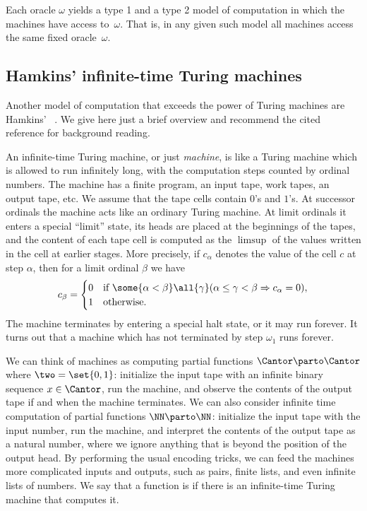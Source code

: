 Each oracle $\omega$ yields a type 1 and a type 2 model of computation in which the machines have access to~$\omega$. That is, in any given such model all machines access the same fixed oracle~$\omega$.


\subsection{Hamkins' infinite-time Turing machines}

\label{sec:iitm}

Another model of computation that exceeds the power of Turing machines are Hamkins' ~. We give here just a brief overview and recommend the cited reference for background reading.

An infinite-time Turing machine, or just \emph{machine}, is like a Turing
machine which is allowed to run infinitely long, with the computation steps
counted by ordinal numbers. The machine has a finite program, an input tape, work
tapes, an output tape, etc. We assume that the tape cells contain $0$'s and
$1$'s. At successor ordinals the machine acts like an ordinary Turing machine.
At limit ordinals it enters a special ``limit'' state, its heads are placed at
the beginnings of the tapes, and the content of each tape cell is computed as
the $\limsup$ of the values written in the cell at earlier stages. More
precisely, if $c_\alpha$ denotes the value of the cell $c$ at step $\alpha$,
then for a limit ordinal $\beta$ we have
%
\begin{equation*}
  c_\beta =
  \begin{cases}
    0 & \text{if $\some{\alpha < \beta} \all{\gamma}
      (\alpha \leq \gamma < \beta \Rightarrow c_\alpha = 0)$},\\
    1 & \text{otherwise}.
  \end{cases}
\end{equation*}
%
The machine terminates by entering a special halt state, or it may run forever. It turns
out that a machine which has not terminated by step $\omega_1$ runs forever.

We can think of machines as computing partial functions $\Cantor \parto \Cantor$ where $\two = \set{0, 1}$:
%
initialize the input tape with an infinite binary sequence $x \in \Cantor$, run the
machine, and observe the contents of the output tape if and when the machine terminates.
We can also consider infinite time computation of partial functions $\NN \parto \NN$:
initialize the input tape with the input number, run the machine, and interpret the
contents of the output tape as a natural number, where we ignore anything that is beyond
the position of the output head. By performing the usual encoding tricks, we can feed the
machines more complicated inputs and outputs, such as pairs, finite lists, and even
infinite lists of numbers. We say that a function is  if there is an infinite-time Turing machine that computes it.

